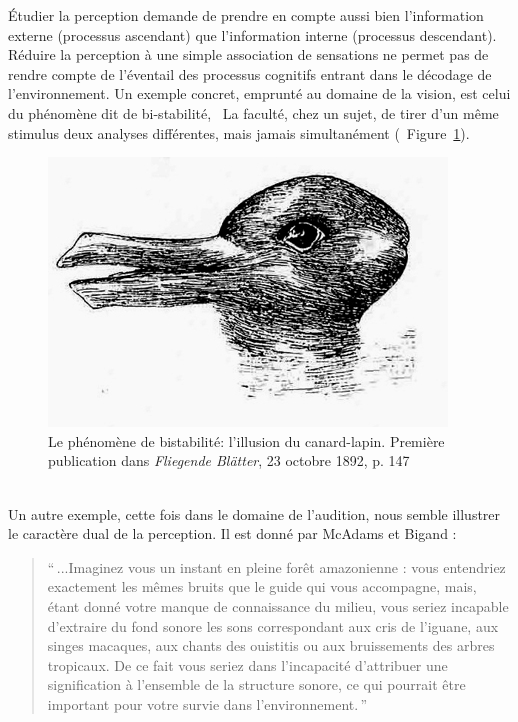 Étudier la perception demande de prendre en compte aussi bien l'information externe (processus ascendant) que l'information interne (processus descendant). Réduire la perception à une simple association de sensations ne permet pas de rendre compte de l'éventail des processus cognitifs entrant dans le décodage de l'environnement. Un exemple concret, emprunté au domaine de la vision, est celui du phénomène dit de bi-stabilité, \ie~La faculté, chez un sujet, de tirer d'un même stimulus deux analyses différentes, mais jamais simultanément (\Cf~Figure~\ref{fig:bistabilite}). \\

\begin{figure}[bth]
        \myfloatalign
        \includegraphics[width=.6\linewidth]{gfx/canard_lapin}
        \caption[Le phénomène de bistabilité: l'illusion du canard-lapin]{Le phénomène de bistabilité: l'illusion du canard-lapin. Première publication dans \emph{Fliegende Blätter}, 23 octobre 1892, p. 147}\label{fig:bistabilite}
\end{figure}

\\

Un autre exemple, cette fois dans le domaine de l'audition, nous semble illustrer le caractère dual de la perception. Il est donné par McAdams et Bigand \citep[p. 2]{mcadams1994penser}:

\begin{quote}
``\,...Imaginez vous un instant en pleine forêt amazonienne : vous entendriez exactement les mêmes bruits que le guide qui vous accompagne, mais, étant donné votre manque de connaissance du milieu, vous seriez incapable d'extraire du fond sonore les sons correspondant aux cris de l'iguane, aux singes macaques, aux chants des ouistitis ou aux bruissements des arbres tropicaux. De ce fait vous seriez dans l'incapacité d'attribuer une signification à l'ensemble de la structure sonore, ce qui pourrait être important pour votre survie dans l'environnement.\,''
\end{quote}

